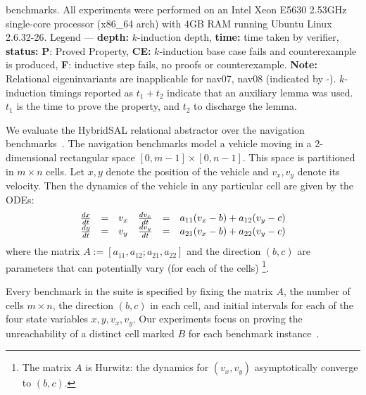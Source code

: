 \documentclass{article}
\begin{document}
\begin{table}[t]
{  benchmarks. All experiments were performed on an Intel Xeon E5630 2.53GHz
  single-core processor (x86\_64 arch) with 4GB RAM running Ubuntu
  Linux 2.6.32-26.  Legend --- \textbf{depth:}
  $k$-induction depth, \textbf{time:} time taken by verifier,
  \textbf{status:}  \textbf{P}: Proved
  Property, \textbf{CE:} $k$-induction base case fails and
  counterexample is produced, \textbf{F}: inductive step fails, no
  proofs or counterexample.  \textbf{Note:} Relational
  eigeninvariants are inapplicable for nav07, nav08 (indicated by -).  
$k$-induction timings  reported as $t_1+t_2$ indicate that an auxiliary lemma was used. $t_1$ is the time to prove the
  property, and $t_2$  to discharge the
 lemma.
}\label{table-exp}
\end{table}

We evaluate the HybridSAL relational abstractor over  the navigation
benchmarks~\cite{benchmarks}.
The navigation benchmarks model a vehicle moving in a
2-dimensional rectangular space $[0,m-1]\times [0,n-1]$.
This space is partitioned in $m\times n$ cells.  Let
$x,y$ denote the position of the vehicle and $v_x,v_y$ denote
its velocity.  Then the dynamics of the vehicle in any particular
cell are given by the ODEs:
\[
\begin{array}{rcl@{\quad}rcl}
 \frac{dx}{dt} &  = & v_x
 &
 \frac{dv_x}{dt} &  = & a_{11} (v_x - b) + a_{12} (v_y - c)
\\
 \frac{dy}{dt} &  = & v_y
 &
 \frac{dv_y}{dt} &  = & a_{21} (v_x - b) + a_{22} (v_y - c)
\end{array}
\]
where the matrix $A := [a_{11},a_{12};a_{21},a_{22}]$ and the
direction $(b,c)$ are parameters that can potentially vary 
(for each of the cells)%
\footnote{The matrix $A$ is Hurwitz:
the dynamics for $(v_x,v_y)$ asymptotically converge to
$(b,c)$.}.

Every benchmark in the suite is
specified by fixing the matrix $A$, the number of cells $m \times n$,
the direction $(b,c)$ in each cell, and initial intervals for each of
the four state variables $x,y,v_x,v_y$.   Our experiments
focus on proving the unreachability of a distinct cell marked $B$ for each benchmark instance~\cite{benchmarks}.
\end{document}
